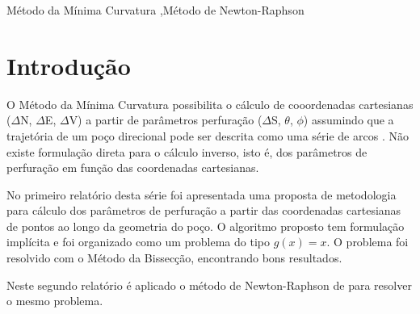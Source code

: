 \documentclass[final,3p,12pt]{elsarticle}
\begin{document}
\begin{frontmatter}
\begin{abstract}
\end{abstract}




\begin{keyword}
    Método da Mínima Curvatura \sep Método de Newton-Raphson



\end{keyword}

\end{frontmatter}


\section{Introdução}

O Método da Mínima Curvatura possibilita o cálculo de cooordenadas cartesianas ($\Delta$N, $\Delta$E, $\Delta$V) a partir de parâmetros perfuração ($\Delta$S, $\theta$, $\phi$) assumindo que a trajetória de um poço direcional pode ser descrita como uma série de arcos \cite{10.2118/84246-MS}. Não existe formulação direta para o cálculo inverso, isto é, dos parâmetros de perfuração em função das coordenadas cartesianas.

No primeiro relatório desta série \cite{relatoriobisseccao} foi apresentada uma proposta de metodologia para cálculo dos parâmetros de perfuração a partir das coordenadas cartesianas de pontos ao longo da geometria do poço. O algoritmo proposto tem formulação implícita e foi organizado como um problema do tipo $g(x)=x$. O problema foi resolvido com o Método da Bissecção, encontrando bons resultados.

Neste segundo relatório é aplicado o método de Newton-Raphson de para resolver o mesmo problema.
\end{document}
